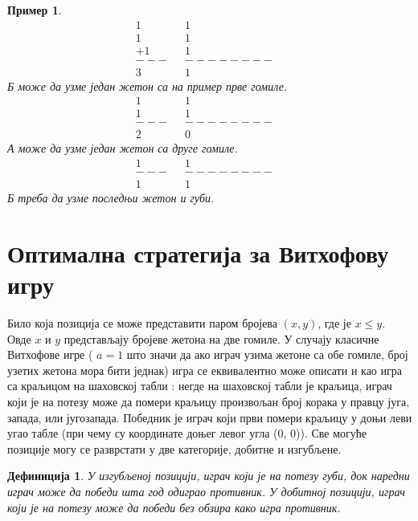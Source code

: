 \documentclass[a4paper]{article}
\newtheorem{example}{Пример}
\newtheorem{definition}{Дефиниција}
\begin{document}
\begin{example}
		\begin{align*}
			1&		&		1&\\
			1&		&       1&\\
			+1&		&  	  	1&\\
			---&	&--------&\\
			3&		&       1
		\end{align*}
	\textit{Б} може да узме један жетон са на пример прве гомиле.
		\begin{align*}
			1&		&		1&\\
			1&		&  	  	1&\\
			---&	&--------&\\
			2&		&       0
		\end{align*}
	\textit{А} може да узме један жетон са друге гомиле.
		\begin{align*}
			1&		&  	  	1&\\
			---&	&--------&\\
			1&		&       1
		\end{align*}
	\textit{Б} треба да узме последњи жетон и губи.
\end{example}

\section{Оптимална стратегија за Витхофову игру}
\label{sec:optimalna_strategija_vithof}

Било која позиција се може представити паром бројева $ (x, y) $, где је $ x \le  y $. Овде $ x $ и $ y $ представљају бројеве жетона на две гомиле. У случају класичне Витхофове игре ( $ a = 1 $ што значи да ако играч узима жетоне са обе гомиле, број узетих жетона мора бити једнак) игра се еквивалентно може описати и као игра са краљицом на шаховској табли \cite{larsson2010restrictions}: негде на шаховској табли је краљица, играч који је на потезу може да помери краљицу произвољан број корака у правцу југа, запада, или југозапада. Победник је играч који први помери краљицу у доњи леви угао табле (при чему су координате доњег левог угла (0, 0)). Све могуће позиције могу се разврстати у две категорије, добитне и изгубљене.

\begin{definition}
	У изгубљеној позицији, играч који је на потезу губи, док наредни играч може да победи шта год одиграо противник. У добитној позицији, играч који је на потезу може да победи без обзира како игра противник.
\end{definition}
\end{document}
